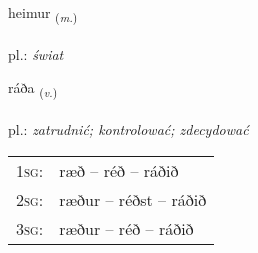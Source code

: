 \documentclass[frontgrid, backgrid]{flacards}\usepackage[]{graphicx}\usepackage[]{xcolor}
\begin{document}
\renewcommand{\flhead}{\vskip5pt \fboxsep=0pt {\small\bfseries\footnotesize Nafnorð | Noun}}
\renewcommand{\fcfoot}{\vskip5pt \fboxsep=0pt \hspace{2pt}{\small\bfseries\footnotesize 1K}}

\renewcommand{\blhead}{\vskip5pt {\small\bfseries\footnotesize Nafnorð | Noun }}
\renewcommand{\bcfoot}{\vskip5pt \hspace{2pt}{\small\bfseries\footnotesize 1K}}


{heimur \small{\textsubscript{(\textit{m.})}} \\[1ex] %
\textphonetic{[heiːmʏr]} \\
pl.: \emph{świat} \\  [2ex]
\renewcommand*{\arraystretch}{0.8}
}

\renewcommand{\flhead}{\vskip5pt \fboxsep=0pt {\small\bfseries\footnotesize Sagnorð | Verb}}
\renewcommand{\fcfoot}{\vskip5pt \fboxsep=0pt \hspace{2pt}{\small\bfseries\footnotesize 1K}}

\renewcommand{\blhead}{\vskip5pt {\small\bfseries\footnotesize Sagnorð | Verb }}
\renewcommand{\bcfoot}{\vskip5pt \hspace{2pt}{\small\bfseries\footnotesize 1K}}


{ráða \small{\textsubscript{(\textit{v.})}} \\[1ex] %
\textphonetic{[rauːða]} \\
pl.: \emph{zatrudnić; kontrolować; zdecydować} \\  [2ex]
\renewcommand*{\arraystretch}{0.8}
\begin{tabular}{p{1cm}l}
\textsc{1sg}: & ræð -- réð -- ráðið \\ 
\textsc{2sg}: & ræður -- réðst -- ráðið \\ 
\textsc{3sg}: & ræður -- réð -- ráðið \\ 
\end{tabular}
}
\end{document}
